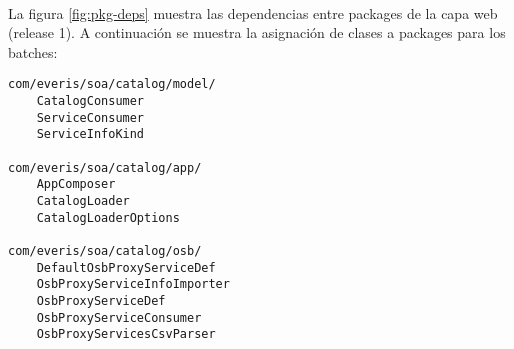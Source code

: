 \paragraph{}
La figura \ref{fig:pkg-deps} muestra las dependencias entre packages de la capa web
(release 1).
A continuaci\'on se muestra la asignaci\'on de clases a packages para los batches:

\begin{verbatim}
com/everis/soa/catalog/model/
    CatalogConsumer
    ServiceConsumer
    ServiceInfoKind

com/everis/soa/catalog/app/
    AppComposer
    CatalogLoader
    CatalogLoaderOptions

com/everis/soa/catalog/osb/
    DefaultOsbProxyServiceDef
    OsbProxyServiceInfoImporter
    OsbProxyServiceDef
    OsbProxyServiceConsumer
    OsbProxyServicesCsvParser
\end{verbatim}

